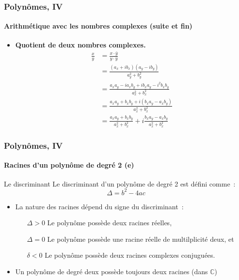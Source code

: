 \documentclass[10pt,notheorems]{beamer}
\theoremstyle{plain}
\theoremstyle{definition} %
\begin{document}
\begin{frame}
  \frametitle{Polynômes, IV}
  \framesubtitle{Arithmétique avec les nombres complexes (suite et fin)}
  \hypertarget{slide_polynome_2_imaginaire_4}{}

  \bigskip

  \begin{itemize}

  \item \textbf{Quotient de deux nombres complexes.}
    \[
      \begin{split}
        \frac{x}{y} &= \frac{x \cdot \bar y}{y \cdot \bar y}\\
        &= \frac{(a_x+ib_x)(a_y-ib_y)}{a_y^2 + b_y^2}\\
        &= \frac{a_xa_y-ia_xb_y+ib_xa_y-i^2b_xb_y}{a_x^2 + b_x^2}\\
        &= \frac{a_xa_y+b_xb_y+i(b_xa_y-a_xb_y)}{a_x^2 + b_x^2}\\
        &= \frac{a_xa_y+b_xb_y}{a_x^2 + b_x^2} + i \frac{b_xa_y-a_xb_y}{a_x^2 + b_x^2}
      \end{split}
    \]

  \end{itemize}

\end{frame}


\begin{frame}
  \frametitle{Polynômes, IV}
  \framesubtitle{Racines d'un polynôme de degré 2 (e)}
  \hypertarget{slide_polynome_2_racines_5}{}

  \bigskip

  \begin{block}{Le discriminant}
    Le discriminant d'un polynôme de degré 2 est défini comme~:
    \[
      \Delta = b^2-4ac
    \]
  \end{block}

  \bigskip

  \begin{itemize}

  \item La nature des racines dépend du signe du discriminant~:\newline

    \begin{itemize}
    \item[$\Delta>0$] Le polynôme possède deux racines réelles,\newline
    \item[$\Delta=0$] Le polynôme possède une racine réelle de multilplicité deux, et\newline
    \item[$\delta<0$] Le polynôme possède deux racines complexes conjuguées.\newline
    \end{itemize}

  \item Un polynôme de degré deux possède toujours deux racines (dans $\mathbb C$)

  \end{itemize}

\end{frame}
\end{document}

